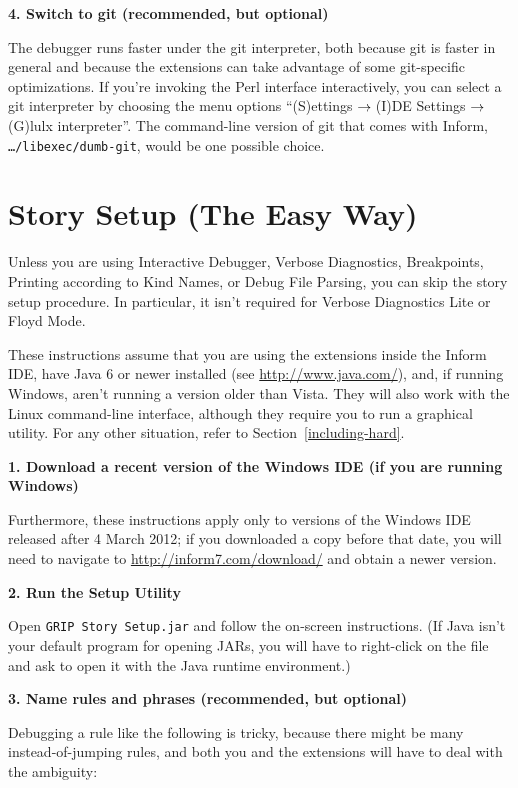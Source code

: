 \documentclass{book}
\newcommand{\lastpagebreak}{\vfill\pagebreak}
\newcommand{\nil}{{\null}}
\newcommand{\thento}{\(\nil\rightarrow\nil\)}
\newcommand{\impatiencesection}[1]{\section{#1}\addcontentsline{toi}{section}{#1}}
\begin{document}
\textbf{4. Switch to git (recommended, but optional)}

The debugger runs faster under the git interpreter, both because git is faster
in general and because the extensions can take advantage of some git-specific
optimizations.  If you're invoking the Perl interface interactively, you can
select a git interpreter by choosing the menu options ``(S)ettings\thento (I)DE
Settings\thento (G)lulx interpreter''.  The command-line version of git that
comes with Inform, \texttt{\dots/libexec/dumb-git}, would be one possible
choice.

\lastpagebreak

\impatiencesection{Story Setup (The Easy Way)}
\label{including-easy}

Unless you are using Interactive Debugger, Verbose Diagnostics, Breakpoints,
Printing according to Kind Names, or Debug File Parsing, you can skip the story
setup procedure.  In particular, it isn't required for Verbose Diagnostics Lite
or Floyd Mode.

These instructions assume that you are using the extensions inside the Inform
IDE, have Java 6 or newer installed (see \url{http://www.java.com/}), and, if
running Windows, aren't running a version older than Vista.  They will also work
with the Linux command-line interface, although they require you to run a
graphical utility.  For any other situation, refer to
Section~\ref{including-hard}.

\textbf{1. Download a recent version of the Windows IDE (if you are running Windows)}

Furthermore, these instructions apply only to versions of the Windows IDE
released after 4 March 2012; if you downloaded a copy before that date, you will
need to navigate to \url{http://inform7.com/download/} and obtain a newer
version.

\textbf{2. Run the Setup Utility}

Open \texttt{GRIP Story Setup.jar} and follow the on-screen instructions.  (If
Java isn't your default program for opening JARs, you will have to right-click
on the file and ask to open it with the Java runtime environment.)

\textbf{3. Name rules and phrases (recommended, but optional)}

Debugging a rule like the following is tricky, because there might be many
instead-of-jumping rules, and both you and the extensions will have to deal with
the ambiguity:

\begin{quote}
  
\end{quote}
\end{document}
